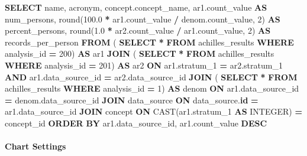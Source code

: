\documentclass[
]{book}
\newenvironment{Shaded}{\begin{snugshade}}{\end{snugshade}}
\newcommand{\DataTypeTok}[1]{\textcolor[rgb]{0.13,0.29,0.53}{#1}}
\newcommand{\DecValTok}[1]{\textcolor[rgb]{0.00,0.00,0.81}{#1}}
\newcommand{\FloatTok}[1]{\textcolor[rgb]{0.00,0.00,0.81}{#1}}
\newcommand{\FunctionTok}[1]{\textcolor[rgb]{0.00,0.00,0.00}{#1}}
\newcommand{\KeywordTok}[1]{\textcolor[rgb]{0.13,0.29,0.53}{\textbf{#1}}}
\newcommand{\NormalTok}[1]{#1}
\newcommand{\OperatorTok}[1]{\textcolor[rgb]{0.81,0.36,0.00}{\textbf{#1}}}
\begin{document}
\begin{Shaded}
\begin{Highlighting}[]
\KeywordTok{SELECT}
\NormalTok{  name,}
\NormalTok{  acronym,}
\NormalTok{  concept.concept\_name,}
\NormalTok{  ar1.count\_value }\KeywordTok{AS}\NormalTok{ num\_persons,}
  \FunctionTok{round}\NormalTok{(}\FloatTok{100.0} \OperatorTok{*}\NormalTok{ ar1.count\_value }\OperatorTok{/}\NormalTok{ denom.count\_value, }\DecValTok{2}\NormalTok{) }\KeywordTok{AS}\NormalTok{ percent\_persons,}
  \FunctionTok{round}\NormalTok{(}\FloatTok{1.0} \OperatorTok{*}\NormalTok{ ar2.count\_value }\OperatorTok{/}\NormalTok{ ar1.count\_value, }\DecValTok{2}\NormalTok{) }\KeywordTok{AS}\NormalTok{ records\_per\_person}
\KeywordTok{FROM}\NormalTok{ (}
  \KeywordTok{SELECT} \OperatorTok{*}
  \KeywordTok{FROM}\NormalTok{ achilles\_results }\KeywordTok{WHERE}\NormalTok{ analysis\_id }\OperatorTok{=} \DecValTok{200}\NormalTok{) }\KeywordTok{AS}\NormalTok{ ar1}
  \KeywordTok{JOIN}\NormalTok{ (}
    \KeywordTok{SELECT} \OperatorTok{*}
    \KeywordTok{FROM}\NormalTok{ achilles\_results }\KeywordTok{WHERE}\NormalTok{ analysis\_id }\OperatorTok{=} \DecValTok{201}\NormalTok{) }\KeywordTok{AS}\NormalTok{ ar2}
    \KeywordTok{ON}\NormalTok{ ar1.stratum\_1 }\OperatorTok{=}\NormalTok{ ar2.stratum\_1 }\KeywordTok{AND}\NormalTok{ ar1.data\_source\_id }\OperatorTok{=}\NormalTok{ ar2.data\_source\_id}
  \KeywordTok{JOIN}\NormalTok{ (}
    \KeywordTok{SELECT} \OperatorTok{*}
    \KeywordTok{FROM}\NormalTok{ achilles\_results }\KeywordTok{WHERE}\NormalTok{ analysis\_id }\OperatorTok{=} \DecValTok{1}\NormalTok{) }\KeywordTok{AS}\NormalTok{ denom}
    \KeywordTok{ON}\NormalTok{ ar1.data\_source\_id }\OperatorTok{=}\NormalTok{ denom.data\_source\_id}
  \KeywordTok{JOIN}\NormalTok{ data\_source }\KeywordTok{ON}\NormalTok{ data\_source.}\KeywordTok{id} \OperatorTok{=}\NormalTok{ ar1.data\_source\_id}
  \KeywordTok{JOIN}\NormalTok{ concept }\KeywordTok{ON} \FunctionTok{CAST}\NormalTok{(ar1.stratum\_1 }\KeywordTok{AS} \DataTypeTok{INTEGER}\NormalTok{) }\OperatorTok{=}\NormalTok{ concept\_id}
\KeywordTok{ORDER} \KeywordTok{BY}\NormalTok{ ar1.data\_source\_id, ar1.count\_value }\KeywordTok{DESC}
\end{Highlighting}
\end{Shaded}

\hypertarget{chart-settings-36}{%
\paragraph*{Chart Settings}\label{chart-settings-36}}
\end{document}
